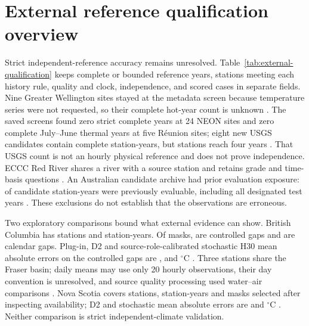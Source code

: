 \section{External reference qualification overview}
Strict independent-reference accuracy remains unresolved. Table~\ref{tab:external-qualification} keeps complete or bounded reference years, stations meeting each history rule, quality and clock, independence, and scored cases in separate fields. Nine Greater Wellington sites stayed at the metadata screen because temperature series were not requested, so their complete hot-year count is unknown \cite{greaterwellington2016quality}. The saved screens found zero strict complete years at 24 NEON sites and zero complete July--June thermal years at five R\'eunion sites; eight new USGS candidates contain \USGSCompleteYears{} complete station-years, but \USGSFourYearStations{} stations reach four years \cite{marzolf2025neon,hubeautemp2026,usgsstatistics2026}. That USGS count is not an hourly physical reference and does not prove independence. ECCC Red River shares a river with a source station and retains grade and time-basis questions \cite{ecccautomated2024,usgsred2025}. An Australian candidate archive had prior evaluation exposure: \AUFirstEvaluable{} of \AURefYears{} candidate station-years were previously evaluable, including all \AUFormerTestEvaluable{} designated test years \cite{bom2026}. These exclusions do not establish that the observations are erroneous.



Two exploratory comparisons bound what external evidence can show. British Columbia has \BCStations{} stations and \BCYears{} station-years. Of \BCMaskTotal{} masks, \BCCases{} are controlled gaps and \BCCalendarMasks{} are calendar gaps. Plug-in, D2 and source-role-calibrated stochastic H30 mean absolute errors on the controlled gaps are \BCPluginMAE{}, \BCDTwoMAE{} and \BCStochasticMAE{} $^{\circ}$C \cite{moore2024bc,callahan2025air2stream}. Three stations share the Fraser basin; daily means may use only 20 hourly observations, their day convention is unresolved, and source quality processing used water--air comparisons \cite{wsc_temperature_faq}. Nova Scotia covers \NSExpStations{} stations, \NSExpYears{} station-years and \NSExpCases{} masks selected after inspecting availability; D2 and stochastic mean absolute errors are \NSExpDTwoMAE{} and \NSExpClassicMAE{} $^{\circ}$C \cite{novascotiawater2026}. Neither comparison is strict independent-climate validation.

